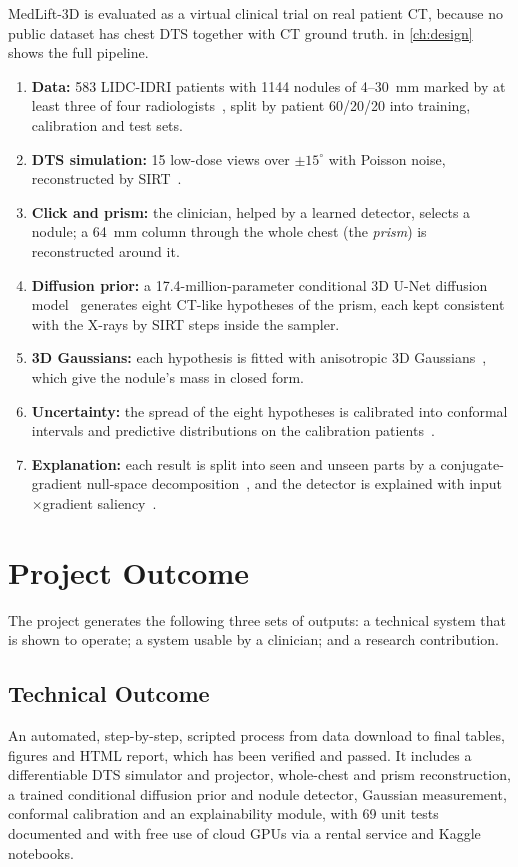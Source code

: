 MedLift-3D is evaluated as a virtual clinical trial on real patient CT, because no public dataset has chest DTS together with CT ground truth.  in \cref{ch:design} shows the full pipeline.
\begin{enumerate}
  \item \textbf{Data:} 583 LIDC-IDRI patients with \num{1144} nodules of 4--30~mm marked by at least three of four radiologists~\cite{armato2011lidc,hancock2016pylidc}, split by patient 60/20/20 into training, calibration and test sets.
  \item \textbf{DTS simulation:} 15 low-dose views over $\pm15^\circ$ with Poisson noise, reconstructed by SIRT~\cite{gilbert1972sirt}.
  \item \textbf{Click and prism:} the clinician, helped by a learned detector, selects a nodule; a 64~mm column through the whole chest (the \emph{prism}) is reconstructed around it.
  \item \textbf{Diffusion prior:} a 17.4-million-parameter conditional 3D U-Net diffusion model~\cite{ho2020ddpm,song2021ddim,salimans2022v} generates eight CT-like hypotheses of the prism, each kept consistent with the X-rays by SIRT steps inside the sampler.
  \item \textbf{3D Gaussians:} each hypothesis is fitted with anisotropic 3D Gaussians~\cite{kerbl2023gs,zha2024r2}, which give the nodule's mass in closed form.
  \item \textbf{Uncertainty:} the spread of the eight hypotheses is calibrated into conformal intervals and predictive distributions on the calibration patients~\cite{vovk2022alrw,vovk2019cps,bostrom2022crepes,angelopoulos2023}.
  \item \textbf{Explanation:} each result is split into seen and unseen parts by a conjugate-gradient null-space decomposition~\cite{bhadra2021,wang2023ddnm}, and the detector is explained with input$\times$gradient saliency~\cite{shrikumar2017}.
\end{enumerate}

\section{Project Outcome}

The project generates the following three sets of outputs: a technical system that is shown to operate; a system usable by a clinician; and a research contribution.

\subsection{Technical Outcome}
An automated, step-by-step, scripted process from data download to final tables, figures and HTML report, which has been verified and passed. It includes a differentiable DTS simulator and projector, whole-chest and prism reconstruction, a trained conditional diffusion prior and nodule detector, Gaussian measurement, conformal calibration and an explainability module, with 69 unit tests documented and with free use of cloud GPUs via a rental service and Kaggle notebooks.

